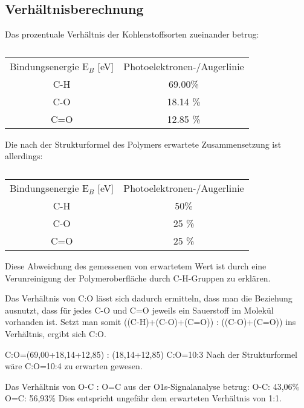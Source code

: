 \documentclass{article}
\begin{document}
\subsection{Verhältnisberechnung}


Das prozentuale Verhältnis der Kohlenstoffsorten zueinander betrug:

\begin{table}[htpb]
  \centering
  \caption{}
  \label{tab:cverh}
  \begin{tabular}{cc}
   Bindungsenergie E$_B$ [eV] & Photoelektronen-/Augerlinie\\
 C-H  & 69.00\% \\
 C-O & 18.14 \% \\
 C=O & 12.85 \% \\
  \end{tabular}
\end{table}
  Die nach der Strukturformel des Polymers erwartete Zusammensetzung ist allerdings:
\begin{table}[htpb]
  \centering
  \caption{}
  \label{tab:orig}
  \begin{tabular}{cc}
   Bindungsenergie E$_B$ [eV] & Photoelektronen-/Augerlinie\\
 C-H  & 50\% \\
 C-O & 25 \% \\
 C=O & 25 \% \\
  \end{tabular}

\end{table}

Diese Abweichung des gemessenen von erwartetem Wert ist durch eine Verunreinigung der Polymeroberfläche durch C-H-Gruppen zu erklären. 

Das Verhältnis von C:O lässt sich dadurch ermitteln, dass man die Beziehung ausnutzt, dass für jedes C-O und C=O jeweils ein Sauerstoff im Molekül vorhanden ist. Setzt man somit 
 ((C-H)+(C-O)+(C=O)) : ((C-O)+(C=O)) ins Verhältnis, ergibt sich C:O. 

C:O=(69,00+18,14+12,85) : (18,14+12,85)
C:O=10:3
Nach der Strukturformel wäre C:O=10:4 zu erwarten gewesen.

Das Verhältnis von O-C : O=C aus der O1s-Signalanalyse betrug:
O-C:	43,06\%	
O=C:	56,93\%
Dies entspricht ungefähr dem erwarteten Verhältnis von 1:1. 



\end{document}

